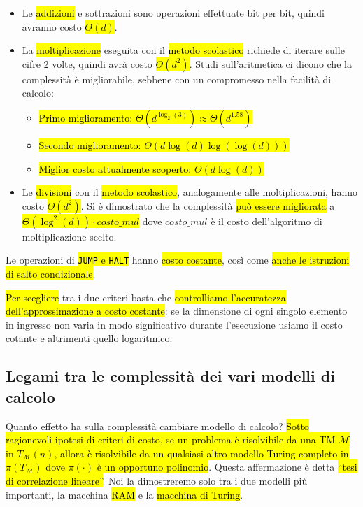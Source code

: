 \documentclass[a4paper,11pt,twoside]{article}
\theoremstyle{plain}
\theoremstyle{definition}
\theoremstyle{remark}
\begin{document}
\begin{itemize}
  \item Le \hl{addizioni} e sottrazioni sono operazioni effettuate bit per bit,
    quindi avranno costo \hl{$\Theta(d)$}.
  \item La \hl{moltiplicazione} eseguita con il \hl{metodo scolastico} richiede
    di iterare sulle cifre 2 volte, quindi avrà costo \hl{$\Theta(d^2)$}. Studi
    sull'aritmetica ci dicono che la complessità è migliorabile, sebbene con un
    compromesso nella facilità di calcolo:

    \begin{itemize}
      \item \hl{Primo miglioramento: $\Theta(d^{\log_2(3)}) \approx
        \Theta(d^{1.58})$}
      \item \hl{Secondo miglioramento: $\Theta(d\log(d)\log(\log(d)))$}
      \item \hl{Miglior costo attualmente scoperto: $\Theta(d\log(d))$}
    \end{itemize}

  \item Le \hl{divisioni} con il \hl{metodo scolastico}, analogamente alle
    moltiplicazioni, hanno costo \hl{$\Theta(d^2)$}. Si è dimostrato che la
    complessità \hl{può essere migliorata} a \hl{$\Theta(\log^2(d)) \cdot
    \mathit{costo\_mul}$} dove $\mathit{costo\_mul}$ è il costo dell'algoritmo
    di moltiplicazione scelto.
\end{itemize}

Le operazioni di \hl{\texttt{JUMP} e \texttt{HALT}} hanno \hl{costo costante},
così come \hl{anche le istruzioni di salto condizionale}.

\hl{Per scegliere} tra i due criteri basta che \hl{controlliamo l'accuratezza
dell'approssimazione a costo costante}: se la dimensione di ogni singolo
elemento in ingresso non varia in modo significativo durante l'esecuzione usiamo
il costo cotante e altrimenti quello logaritmico.

\subsection{Legami tra le complessità dei vari modelli di calcolo}

Quanto effetto ha sulla complessità cambiare modello di calcolo? \hl{Sotto
ragionevoli ipotesi di criteri di costo, se un problema è risolvibile da una TM
$\mathcal{M}$ in $T_\mathcal{M}(n)$, allora è risolvibile da un qualsiasi altro
modello Turing-completo in $\pi(T_\mathcal{M})$ dove $\pi(\cdot)$ è un opportuno
polinomio}. Questa affermazione è detta \hl{``tesi di correlazione lineare''}.
Noi la dimostreremo solo tra i due modelli più importanti, la macchina \hl{RAM}
e la \hl{macchina di Turing}.
\end{document}
